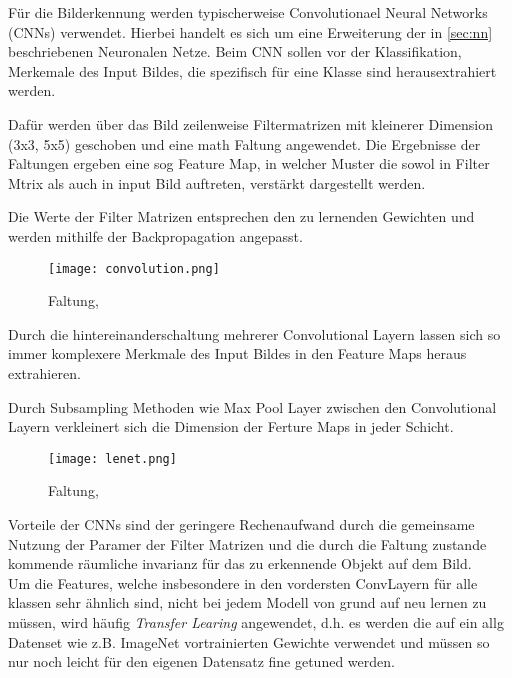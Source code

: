 Für die Bilderkennung werden typischerweise Convolutionael 
Neural Networks (CNNs) verwendet. Hierbei handelt es sich um eine Erweiterung
der in \ref{sec:nn} beschriebenen Neuronalen Netze. Beim CNN 
sollen vor der Klassifikation, Merkemale des Input Bildes,
die spezifisch für eine Klasse sind herausextrahiert werden.

Dafür werden über das Bild zeilenweise Filtermatrizen mit kleinerer Dimension
(3x3, 5x5) geschoben und eine math Faltung angewendet.
Die Ergebnisse der Faltungen ergeben eine sog Feature Map, in welcher 
Muster die sowol in Filter Mtrix als auch in input Bild auftreten, verstärkt 
dargestellt werden.

Die Werte der Filter Matrizen entsprechen den zu lernenden Gewichten 
und werden mithilfe der Backpropagation angepasst.

\begin{figure}[htb]
    \centering
    \label{fig:conv}
    \texttt{[image: convolution.png]}
    \caption{Faltung, \cite{researcherSimpleIntroductionConvolutional2019}}
\end{figure}



Durch die hintereinanderschaltung mehrerer Convolutional Layern 
lassen sich so immer komplexere Merkmale des Input Bildes in den 
Feature Maps heraus extrahieren.

Durch Subsampling Methoden wie Max Pool Layer zwischen den Convolutional
Layern verkleinert sich die Dimension der Ferture Maps in jeder Schicht.


\begin{figure}[htb]
    \centering
    \label{fig:conv}
    \texttt{[image: lenet.png]}
    \caption{Faltung, \cite{lecunGradientBasedLearningApplied1998}}
\end{figure}


Vorteile der CNNs sind der geringere Rechenaufwand durch die gemeinsame 
Nutzung der Paramer der Filter Matrizen und die durch die 
Faltung zustande kommende räumliche invarianz für das zu erkennende 
Objekt auf dem Bild.
\\
Um die Features, welche insbesondere in den vordersten ConvLayern für 
alle klassen sehr ähnlich sind, nicht bei jedem Modell von grund auf 
neu lernen zu müssen, wird häufig \textit{Transfer Learing} angewendet, 
d.h. es werden die auf ein allg Datenset wie z.B. ImageNet vortrainierten
Gewichte verwendet und müssen so nur noch leicht für den eigenen Datensatz 
fine getuned werden.


